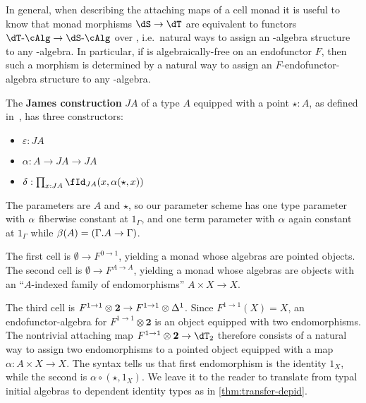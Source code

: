 \begin{enumerate}
\begin{enumerate}
In general, when describing the attaching maps of a cell monad it is useful to know that monad morphisms $\dS\to\dT$ are equivalent to functors $\dT\alg\to\dS\alg$ over \sM, i.e.\ natural ways to assign an \dS-algebra structure to any \dT-algebra.
In particular, if \dS is algebraically-free on an endofunctor $F$, then such a morphism is determined by a natural way to assign an $F$-endofunctor-algebra structure to any \dT-algebra.

\begin{eg} \label{eg:james}
  The \textbf{James construction} $JA$ of a type $A$ equipped with a point $\star : A$, as defined in~\cite{brunerie:thesis}, has three constructors:
  \begin{itemize}
  \item $\varepsilon : JA$
  \item $\alpha : A \to JA \to JA$
  \item $\delta : \prod_{x:JA} \id[JA]{x}{\alpha(\star,x)}$
  \end{itemize}
  The parameters are $A$ and $\star$, so our parameter scheme has one type parameter with $\alpha$ fiberwise constant at $1_\Gamma$, and one term parameter with $\alpha$ again constant at $1_\Gamma$ while $\beta(A) = (\Gamma.A\to \Gamma)$.

  The first cell is $\emptyset \to F^{0\to 1}$, yielding a monad whose algebras are pointed objects.
  The second cell is $\emptyset \to F^{A\to A}$, yielding a monad whose algebras are objects with an ``$A$-indexed family of endomorphisms'' $A\times X\to X$.

  The third cell is $F^{1\to 1}\otimes \mathbf{2}\to F^{1\to 1}\otimes {\Delta^1}$.
  Since $F^{1\to 1}(X) = X$, an endofunctor-algebra for $F^{1\to 1}\otimes \mathbf{2}$ is an object equipped with two endomorphisms.
  The nontrivial attaching map $F^{1\to 1}\otimes \mathbf{2} \to \dT_2$ therefore consists of a natural way to assign two endomorphisms to a pointed object equipped with a map $\alpha:A\times X\to X$.
  The syntax tells us that first endomorphism is the identity $1_X$, while the second is $\alpha \circ (\star,1_X)$.
  We leave it to the reader to translate from typal initial algebras to dependent identity types as in \cref{thm:transfer-depid}.
\end{eg}


\end{enumerate}
\end{enumerate}
